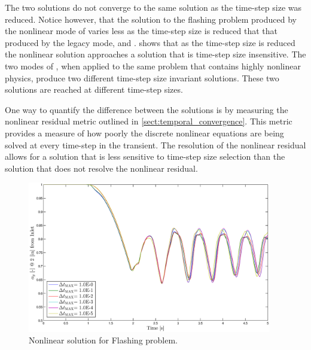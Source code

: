 The two solutions do not converge to the same solution as the time-step size was reduced.
Notice however, that the solution to the flashing problem produced by the nonlinear mode of \cobra{} varies less as the time-step size is reduced that that produced by the legacy mode,  and .
 shows that as the time-step size is reduced the nonlinear solution approaches a solution that is time-step size insensitive.
The two modes of \cobra{}, when applied to the same problem that contains highly nonlinear physics, produce two different time-step size invariant solutions.
These two solutions are reached at different time-step sizes.

One way to quantify the difference between the solutions is by measuring the nonlinear residual metric outlined in \ref{sect:temporal_convergence}.
This metric provides a measure of how poorly the discrete nonlinear equations are being solved at every time-step in the transient.
The resolution of the nonlinear residual allows for a solution that is less sensitive to time-step size selection than the solution that does not resolve the nonlinear residual.

\begin{figure}[h!t!]
\begin{center}
\includegraphics[width=0.95\textwidth]{images/nl_flashing_al_2in.eps}
\end{center}
\caption{Nonlinear solution for Flashing problem.}
\label{fig:nl_mode_flashing}
\end{figure}


